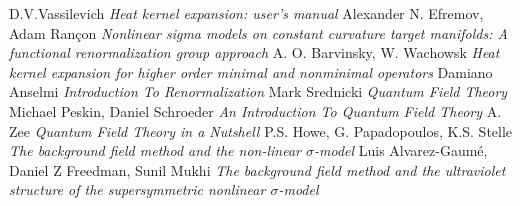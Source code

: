 \documentclass[fleqn]{article}
\begin{document}
\clearpage

\begin{thebibliography}{9}
D.V.Vassilevich \emph{Heat kernel expansion: user’s manual}
Alexander N. Efremov, Adam Rançon \emph{Nonlinear sigma models on constant curvature target manifolds: A functional renormalization group approach} 
A. O. Barvinsky, W. Wachowsk \emph{Heat kernel expansion for higher order minimal and nonminimal operators}
Damiano Anselmi \emph{Introduction To Renormalization}
Mark Srednicki \emph{Quantum Field Theory}
Michael Peskin, Daniel Schroeder \emph{An Introduction To Quantum Field Theory}
A. Zee \emph{Quantum Field Theory in a Nutshell}
P.S. Howe, G. Papadopoulos, K.S. Stelle \emph{The background field method and the non-linear $\sigma$-model}
Luis Alvarez-Gaumé, Daniel Z Freedman, Sunil Mukhi \emph{The background field method and the ultraviolet structure of the supersymmetric nonlinear $\sigma$-model}

\end{thebibliography}
\end{document}
